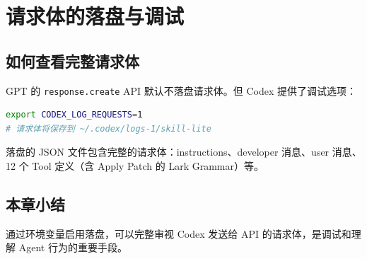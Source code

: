 \section{请求体的落盘与调试}

\subsection{如何查看完整请求体}

GPT 的 \texttt{response.create} API 默认不落盘请求体。但 Codex 提供了调试选项：

\begin{lstlisting}[caption={启用请求体落盘的环境变量}, language=bash]
export CODEX_LOG_REQUESTS=1
# 请求体将保存到 ~/.codex/logs-1/skill-lite
\end{lstlisting}

落盘的 JSON 文件包含完整的请求体：instructions、developer 消息、user 消息、12 个 Tool 定义（含 Apply Patch 的 Lark Grammar）等。

\subsection{本章小结}

通过环境变量启用落盘，可以完整审视 Codex 发送给 API 的请求体，是调试和理解 Agent 行为的重要手段。


